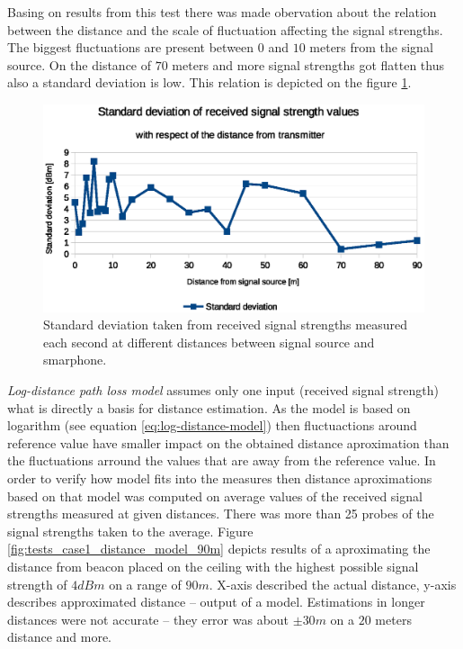 \documentclass[../main.tex]{subfiles}
\begin{document}
Basing on results from this test there was made obervation about the relation between the distance and the scale of fluctuation affecting the signal strengths. The biggest fluctuations are present between $0$ and $10$ meters from the signal source. On the distance of $70$ meters and more signal strengths got flatten thus also a standard deviation is low. This relation is depicted on the figure \ref{fig:tests_case1_fluctuations_over_time_std_dev}.

\begin{figure}[ht]
\includegraphics[width=\textwidth, keepaspectratio]{pictures/tests_case1_fluctuations_over_time_std_dev}
\centering
\caption{Standard deviation taken from received signal strengths measured each second at different distances between signal source and smarphone.}
\label{fig:tests_case1_fluctuations_over_time_std_dev}
\end{figure}

\textit{Log-distance path loss model} assumes only one input (received signal strength) what is directly a basis for distance estimation. As the model is based on logarithm (see equation \ref{eq:log-distance-model}) then fluctuactions around reference value have smaller impact on the obtained distance aproximation than the fluctuations arround the values that are away from the reference value. In order to verify how model fits into the measures then distance aproximations based on that model was computed on average values of the received signal strengths measured at given distances. There was more than 25 probes of the signal strengths taken to the average. Figure \ref{fig:tests_case1_distance_model_90m} depicts results of a aproximating the distance from beacon placed on the ceiling with the highest possible signal strength of $4dBm$ on a range of $90 m$. X-axis described the actual distance, y-axis describes approximated distance -- output of a model. Estimations in longer distances were not accurate -- they error was about $\pm 30m$ on a $20$ meters distance and more.
\end{document}
